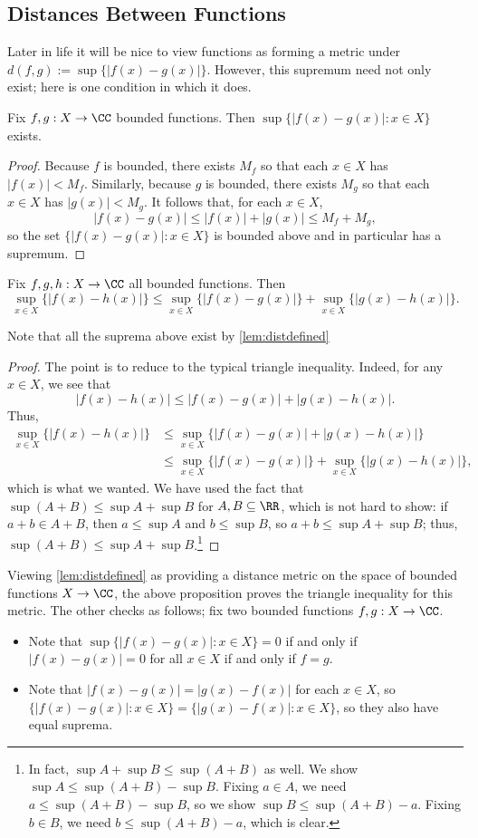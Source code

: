 \subsection{Distances Between Functions}
Later in life it will be nice to view functions as forming a metric under $d(f,g):=\sup\{|f(x)-g(x)|\}$. However, this supremum need not only exist; here is one condition in which it does.
\begin{lemma} \label{lem:distdefined}
	Fix $f,g:X\to\CC$ bounded functions. Then $\sup\{|f(x)-g(x)|:x\in X\}$ exists.
\end{lemma}
\begin{proof}
	Because $f$ is bounded, there exists $M_f$ so that each $x\in X$ has $|f(x)|<M_f$. Similarly, because $g$ is bounded, there exists $M_g$ so that each $x\in X$ has $|g(x)|<M_g$. It follows that, for each $x\in X$,
	\[|f(x)-g(x)|\le|f(x)|+|g(x)|\le M_f+M_g,\]
	so the set $\{|f(x)-g(x)|:x\in X\}$ is bounded above and in particular has a supremum.
\end{proof}
\begin{proposition}
	Fix $f,g,h:X\to\CC$ all bounded functions. Then
	\[\sup_{x\in X}\{|f(x)-h(x)|\}\le\sup_{x\in X}\{|f(x)-g(x)|\}+\sup_{x\in X}\{|g(x)-h(x)|\}.\]
\end{proposition}
Note that all the suprema above exist by \autoref{lem:distdefined}
\begin{proof}
	The point is to reduce to the typical triangle inequality. Indeed, for any $x\in X$, we see that
	\[|f(x)-h(x)|\le|f(x)-g(x)|+|g(x)-h(x)|.\]
	Thus,
	\begin{align*}
		\sup_{x\in X}\{|f(x)-h(x)|\} &\le \sup_{x\in X}\{|f(x)-g(x)|+|g(x)-h(x)|\} \\
		&\le \sup_{x\in X}\{|f(x)-g(x)|\}+\sup_{x\in X}\{|g(x)-h(x)|\},
	\end{align*}
	which is what we wanted. We have used the fact that $\sup(A+B)\le\sup A+\sup B$ for $A,B\subseteq\RR$, which is not hard to show: if $a+b\in A+B$, then $a\le\sup A$ and $b\le\sup B$, so $a+b\le\sup A+\sup B$; thus, $\sup(A+B)\le\sup A+\sup B$.\footnote{In fact, $\sup A+\sup B\le\sup(A+B)$ as well. We show $\sup A\le\sup(A+B)-\sup B$. Fixing $a\in A$, we need $a\le\sup(A+B)-\sup B$, so we show $\sup B\le\sup(A+B)-a$. Fixing $b\in B$, we need $b\le\sup(A+B)-a$, which is clear.}
\end{proof}
\begin{remark}[Nir] \label{rem:metriconfuncs}
	Viewing \autoref{lem:distdefined} as providing a distance metric on the space of bounded functions $X\to\CC$, the above proposition proves the triangle inequality for this metric. The other checks as follows; fix two bounded functions $f,g:X\to\CC$.
	\begin{itemize}
		\item Note that $\sup\{|f(x)-g(x)|:x\in X\}=0$ if and only if $|f(x)-g(x)|=0$ for all $x\in X$ if and only if $f=g$.
		\item Note that $|f(x)-g(x)|=|g(x)-f(x)|$ for each $x\in X$, so $\{|f(x)-g(x)|:x\in X\}=\{|g(x)-f(x)|:x\in X\}$, so they also have equal suprema.
	\end{itemize}
\end{remark}
